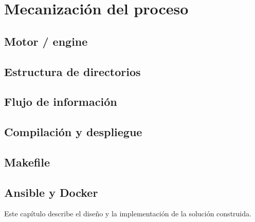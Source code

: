 \section{Mecanización del proceso}
\subsection{Motor / engine}
\subsection{Estructura de directorios}
\subsection{Flujo de información}

\subsection{Compilación y despliegue}
\subsection{Makefile}
\subsection{Ansible y Docker}


Este capítulo describe el diseño y la implementación de la solución construida.

